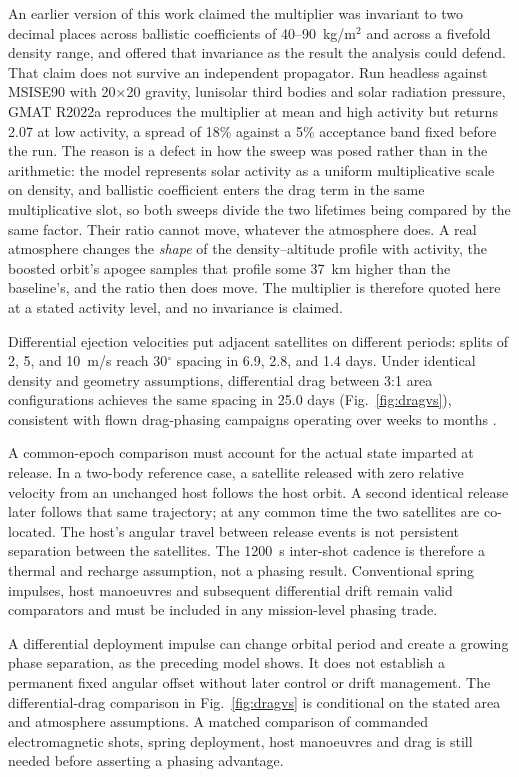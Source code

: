\documentclass[conference]{IEEEtran}
\begin{document}
An earlier version of this work claimed the multiplier was invariant to two decimal places across ballistic coefficients of 40--90~kg/m$^2$ and across a fivefold density range, and offered that invariance as the result the analysis could defend. That claim does not survive an independent propagator. Run headless against MSISE90 with 20$\times$20 gravity, lunisolar third bodies and solar radiation pressure, GMAT R2022a reproduces the multiplier at mean and high activity but returns 2.07 at low activity, a spread of 18\% against a 5\% acceptance band fixed before the run. The reason is a defect in how the sweep was posed rather than in the arithmetic: the model represents solar activity as a uniform multiplicative scale on density, and ballistic coefficient enters the drag term in the same multiplicative slot, so both sweeps divide the two lifetimes being compared by the same factor. Their ratio cannot move, whatever the atmosphere does. A real atmosphere changes the \emph{shape} of the density--altitude profile with activity, the boosted orbit's apogee samples that profile some 37~km higher than the baseline's, and the ratio then does move. The multiplier is therefore quoted here at a stated activity level, and no invariance is claimed.

Differential ejection velocities put adjacent satellites on different periods: splits of 2, 5, and 10~m/s reach 30$^\circ$ spacing in 6.9, 2.8, and 1.4 days. Under identical density and geometry assumptions, differential drag between 3:1 area configurations achieves the same spacing in 25.0 days (Fig.~\ref{fig:dragvs}), consistent with flown drag-phasing campaigns operating over weeks to months \cite{foster}.

A common-epoch comparison must account for the actual state imparted at release. In a two-body reference case, a satellite released with zero relative velocity from an unchanged host follows the host orbit. A second identical release later follows that same trajectory; at any common time the two satellites are co-located. The host's angular travel between release events is not persistent separation between the satellites. The 1200~s inter-shot cadence is therefore a thermal and recharge assumption, not a phasing result. Conventional spring impulses, host manoeuvres and subsequent differential drift remain valid comparators and must be included in any mission-level phasing trade.

A differential deployment impulse can change orbital period and create a growing phase separation, as the preceding model shows. It does not establish a permanent fixed angular offset without later control or drift management. The differential-drag comparison in Fig.~\ref{fig:dragvs} is conditional on the stated area and atmosphere assumptions. A matched comparison of commanded electromagnetic shots, spring deployment, host manoeuvres and drag is still needed before asserting a phasing advantage.
\end{document}
